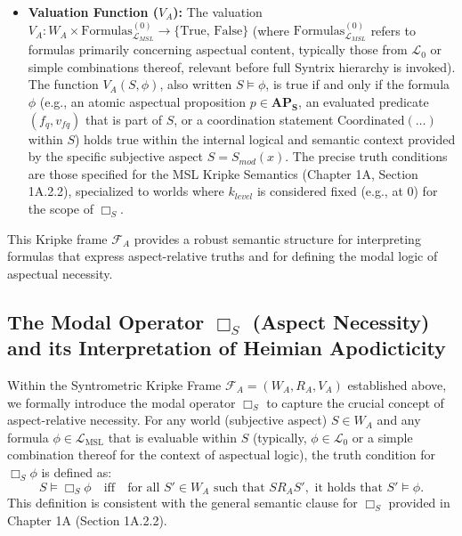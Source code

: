 \documentclass[
    12pt,              %
    a4paper,           %
    headings=normal,   %
    twoside=true,      %
    BCOR=8mm,          %
]{scrbook}
\newcommand{\LMSL}{\mathcal{L}_{\text{MSL}}}
\newcommand{\BoxS}{\Box_S}
\newcommand{\APS}{\mathbf{AP_S}}
\begin{document}
\begin{itemize}
    \item   \textbf{Valuation Function (\(V_A\)):} The valuation \(V_A: W_A \times \text{Formulas}_{\mathcal{L}_{MSL}}^{(0)} \to \{\text{True, False}\}\) (where \(\text{Formulas}_{\mathcal{L}_{MSL}}^{(0)}\) refers to formulas primarily concerning aspectual content, typically those from \(\mathcal{L}_0\) or simple combinations thereof, relevant before full Syntrix hierarchy is invoked). The function \(V_A(S, \phi)\), also written \(S \vDash \phi\), is true if and only if the formula \(\phi\) (e.g., an atomic aspectual proposition \(p \in \APS\), an evaluated predicate \((f_q, v_{fq})\) that is part of \(S\), or a coordination statement \(\text{Coordinated}(\dots)\) within \(S\)) holds true within the internal logical and semantic context provided by the specific subjective aspect \(S = S_{mod}(x)\). The precise truth conditions are those specified for the MSL Kripke Semantics (Chapter 1A, Section 1A.2.2), specialized to worlds where \(k_{level}\) is considered fixed (e.g., at 0) for the scope of \(\BoxS\).
\end{itemize}
This Kripke frame \(\mathcal{F}_A\) provides a robust semantic structure for interpreting formulas that express aspect-relative truths and for defining the modal logic of aspectual necessity.

\subsection{The Modal Operator \(\BoxS\) (Aspect Necessity) and its Interpretation of Heimian Apodicticity}
\label{sec:ch1_modal_operator_apodiktik} 

Within the Syntrometric Kripke Frame \(\mathcal{F}_A = (W_A, R_A, V_A)\) established above, we formally introduce the modal operator \(\BoxS\) to capture the crucial concept of aspect-relative necessity. For any world (subjective aspect) \(S \in W_A\) and any formula \(\phi \in \LMSL\) that is evaluable within \(S\) (typically, \(\phi \in \mathcal{L}_0\) or a simple combination thereof for the context of aspectual logic), the truth condition for \(\BoxS \phi\) is defined as:
\[ S \vDash \BoxS \phi \quad \text{iff} \quad \text{for all } S' \in W_A \text{ such that } S R_A S', \text{ it holds that } S' \vDash \phi. \]
This definition is consistent with the general semantic clause for \(\BoxS\) provided in Chapter 1A (Section 1A.2.2).
\end{document}
